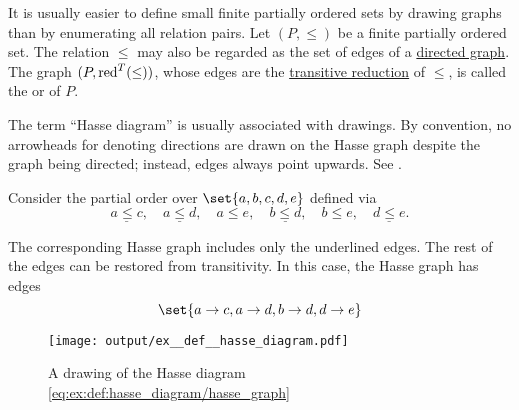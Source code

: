 \begin{definition}\label{def:hasse_diagram}
  It is usually easier to define small finite partially ordered sets by drawing graphs than by enumerating all relation pairs. Let \( (P, \leq) \) be a finite partially ordered set. The relation \( \leq \) may also be regarded as the set of edges of a \hyperref[def:quiver/simple]{directed graph}. The graph \( (P, \operatorname{red}^T(\leq)) \), whose edges are the \hyperref[def:relation_closures/transitive]{transitive reduction} of \( \leq \), is called the  or  of \( P \).

  The term \enquote{Hasse diagram} is usually associated with drawings. By convention, no arrowheads for denoting directions are drawn on the Hasse graph despite the graph being directed; instead, edges always point upwards. See .
\end{definition}

\begin{example}\label{ex:def:hasse_diagram}
  Consider the partial order over \( \set{ a, b, c, d, e } \) defined via
  \begin{equation}\label{eq:ex:def:hasse_diagram/partially ordered set}
    \underline{a \leq c},\quad \underline{a \leq d},\quad a \leq e,\quad \underline{b \leq d},\quad b \leq e,\quad \underline{d \leq e}.
  \end{equation}

  The corresponding Hasse graph includes only the underlined edges. The rest of the edges can be restored from transitivity. In this case, the Hasse graph has edges
  \begin{equation}\label{eq:ex:def:hasse_diagram/hasse_graph}
    \set{ a \to c, a \to d, b \to d, d \to e }
  \end{equation}

  \begin{figure}[!ht]
    \centering
    \texttt{[image: output/ex\_\_def\_\_hasse\_diagram.pdf]}
    \caption{A drawing of the Hasse diagram \eqref{eq:ex:def:hasse_diagram/hasse_graph}}
    \label{fig:ex:def:hasse_diagram}
  \end{figure}
\end{example}

